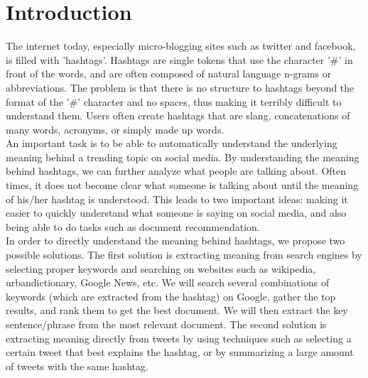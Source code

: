 \documentclass{sig-alternate}
\begin{document}
\section{Introduction}
The internet today, especially micro-blogging sites such as twitter and facebook, is filled with 'hashtags'. Hashtags are single tokens that use the character '\#' in front of the words, and are often composed of natural language n-grams or abbreviations. The problem is that there is no structure to hashtags beyond the format of the '\#' character and no spaces, thus making it terribly difficult to understand them. Users often create hashtags that are slang, concatenations of many words, acronyms, or simply made up words.\\
An important task is to be able to automatically understand the underlying meaning behind a trending topic on social media. By understanding the meaning behind hashtags, we can further analyze what people are talking about. Often times, it does not become clear what someone is talking about until the meaning of his/her hashtag is understood. This leads to two important ideas: making it easier to quickly understand what someone is saying on social media, and also being able to do tasks such as document recommendation.\\
In order to directly understand the meaning behind hashtags, we propose two possible solutions. The first solution is extracting meaning from search engines by selecting proper keywords and searching on websites such as wikipedia, urbandictionary, Google News, etc. We will search several combinations of keywords (which are extracted from the hashtag) on Google, gather the top results, and rank them to get the best document. We will then extract the key sentence/phrase from the most relevant document. The second solution is extracting meaning directly from tweets by using techniques such as selecting a certain tweet that best explains the hashtag, or by summarizing a large amount of tweets with the same hashtag.\\
\end{document}
